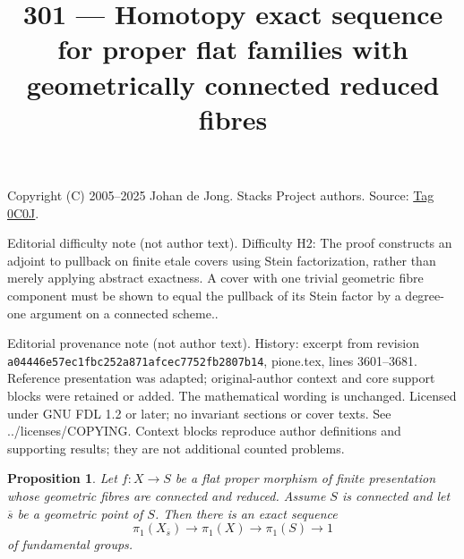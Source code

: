 \documentclass{amsart}
\theoremstyle{plain}
\newtheorem{proposition}[subsection]{Proposition}
\theoremstyle{definition}
\theoremstyle{remark}
\numberwithin{equation}{subsection}
\begin{document}
\title[Stacks Project, Tag 0C0J]{301 --- Homotopy exact sequence for proper flat families with geometrically connected reduced fibres}
\maketitle
\noindent Copyright (C) 2005--2025 Johan de Jong. Stacks Project authors. Source: \href{https://stacks.math.columbia.edu/tag/0C0J}{Tag 0C0J}.

\noindent Editorial difficulty note (not author text). Difficulty H2: The proof constructs an adjoint to pullback on finite etale covers using Stein factorization, rather than merely applying abstract exactness. A cover with one trivial geometric fibre component must be shown to equal the pullback of its Stein factor by a degree-one argument on a connected scheme..

\noindent Editorial provenance note (not author text). History: excerpt from revision \texttt{a0444\allowbreak 6e57e\allowbreak c1fbc\allowbreak 252a8\allowbreak 71afc\allowbreak ec775\allowbreak 2fb28\allowbreak 07b14}, pione.tex, lines 3601--3681. Reference presentation was adapted; original-author context and core support blocks were retained or added. The mathematical wording is unchanged. Licensed under GNU FDL 1.2 or later; no invariant sections or cover texts. See ../licenses/COPYING. Context blocks reproduce author definitions and supporting results; they are not additional counted problems.

\begin{proposition}
\label{proposition-first-homotopy-sequence}
Let $f : X \to S$ be a flat proper morphism of finite presentation whose
geometric fibres are connected and reduced. Assume $S$ is connected and
let $\overline{s}$ be a geometric point of $S$. Then there is an exact
sequence
$$
\pi_1(X_{\overline{s}}) \to \pi_1(X) \to \pi_1(S) \to 1
$$
of fundamental groups.
\end{proposition}
\end{document}
